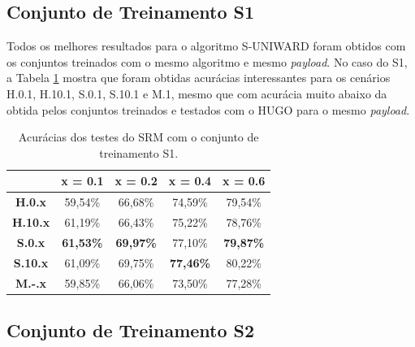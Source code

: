 \subsection{Conjunto de Treinamento S1}

Todos os melhores resultados para o algoritmo S-UNIWARD foram obtidos com os conjuntos treinados com o mesmo algoritmo e mesmo \textit{payload}. No caso do S1, a Tabela \ref{tab:suni_s1} mostra que foram obtidas acurácias interessantes para os cenários H.0.1, H.10.1, S.0.1, S.10.1 e M.1, mesmo que com acurácia muito abaixo da obtida pelos conjuntos treinados e testados com o HUGO para o mesmo \textit{payload}.

\begin{table}[!htb]
\centering
\begin{tabular}{c|c|c|c|c|}
\cline{2-5}
\textbf{}                             & \textbf{x = 0.1} & \textbf{x = 0.2} & \textbf{x = 0.4} & \textbf{x = 0.6} \\ \hline
\multicolumn{1}{|c|}{\textbf{H.0.x}}  & 59,54\%          & 66,68\%          & 74,59\%          & 79,54\%          \\ \hline
\multicolumn{1}{|c|}{\textbf{H.10.x}} & 61,19\%          & 66,43\%          & 75,22\%          & 78,76\%   \\ \hline
\multicolumn{1}{|c|}{\textbf{S.0.x}}  & \textbf{61,53\%}          & \textbf{69,97\%}          & 77,10\%          & \textbf{79,87\%}          \\ \hline
\multicolumn{1}{|c|}{\textbf{S.10.x}} &
61,09\% & 69,75\% & \textbf{77,46\%} & 80,22\% \\ \hline
\multicolumn{1}{|c|}{\textbf{M.-.x}}  & 59,85\%          & 66,06\%          & 73,50\%          & 77,28\%          \\ \hline
\end{tabular}
\caption{Acurácias dos testes do SRM com o conjunto de treinamento S1.}
\label{tab:suni_s1}

\end{table}



\subsection{Conjunto de Treinamento S2}

